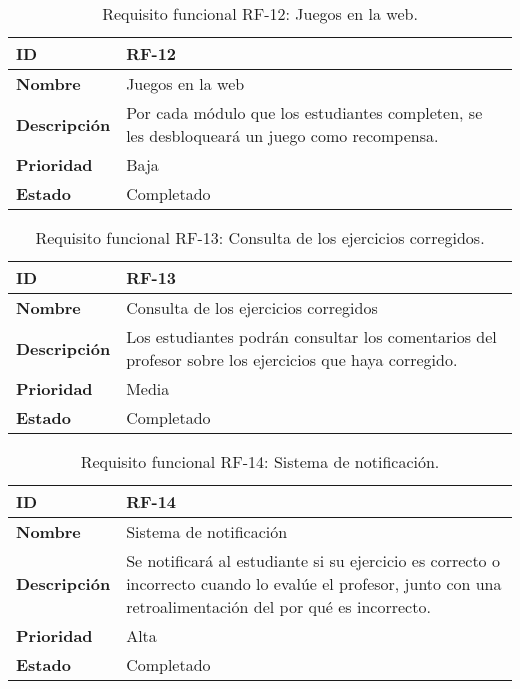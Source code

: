 \begin{table}[H]
    \centering
    \begin{tabular}{|l|p{9.5cm}|}
        \hline
        \textbf{ID} & RF-12 \\
        \hline
        \textbf{Nombre} & Juegos en la web \\
        \hline
        \textbf{Descripción} & Por cada módulo que los estudiantes completen, se les desbloqueará un juego como recompensa. \\
        \hline
        \textbf{Prioridad} & Baja \\
        \hline
        \textbf{Estado} & Completado \\
        \hline
    \end{tabular}
    \caption{Requisito funcional RF-12: Juegos en la web.}
    \label{table:req-RF00A}
\end{table}

\begin{table}[H]
    \centering
    \begin{tabular}{|l|p{9.5cm}|}
        \hline
        \textbf{ID} & RF-13 \\
        \hline
        \textbf{Nombre} & Consulta de los ejercicios corregidos \\
        \hline
        \textbf{Descripción} & Los estudiantes podrán consultar los comentarios del profesor sobre los ejercicios que haya corregido. \\
        \hline
        \textbf{Prioridad} & Media \\
        \hline
        \textbf{Estado} & Completado \\
        \hline
    \end{tabular}
    \caption{Requisito funcional RF-13: Consulta de los ejercicios corregidos.}
    \label{table:req-RF00B}
\end{table}

\begin{table}[H]
    \centering
    \begin{tabular}{|l|p{9.5cm}|}
        \hline
        \textbf{ID} & RF-14 \\
        \hline
        \textbf{Nombre} & Sistema de notificación \\
        \hline
        \textbf{Descripción} & Se notificará al estudiante si su ejercicio es correcto o incorrecto cuando lo evalúe el profesor, junto con una retroalimentación del por qué es incorrecto. \\
        \hline
        \textbf{Prioridad} & Alta \\
        \hline
        \textbf{Estado} & Completado \\
        \hline
    \end{tabular}
    \caption{Requisito funcional RF-14: Sistema de notificación.}
    \label{table:req-RF00C}
\end{table}

